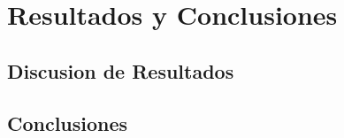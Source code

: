 \newpage
\thispagestyle{sectioned}
\chapter{Resultados y Conclusiones}

\section{Discusion de Resultados}

\section{Conclusiones}


